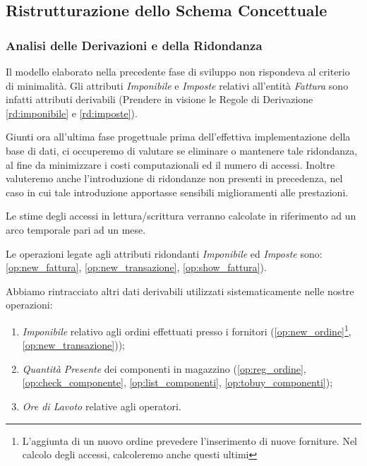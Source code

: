	\subsection{Ristrutturazione dello Schema Concettuale}

		\subsubsection{Analisi delle Derivazioni e della Ridondanza}

			Il modello elaborato nella precedente fase di sviluppo non rispondeva al criterio di minimalità. Gli attributi \emph{Imponibile} e \emph{Imposte} relativi all'entità \emph{Fattura} sono infatti attributi derivabili (Prendere in visione le Regole di Derivazione \ref{rd:imponibile} e \ref{rd:imposte}).

			Giunti ora all'ultima fase progettuale prima dell'effettiva implementazione della base di dati, ci occuperemo di valutare se eliminare o mantenere tale ridondanza, al fine da minimizzare i costi computazionali ed il numero di accessi. Inoltre valuteremo anche l'introduzione di ridondanze non presenti in precedenza, nel caso in cui tale introduzione apportasse sensibili miglioramenti alle prestazioni.

			Le stime degli accessi in lettura/scrittura verranno calcolate in riferimento ad un arco temporale pari ad un mese.

			Le operazioni legate agli attributi ridondanti \emph{Imponibile} ed \emph{Imposte} sono: \ref{op:new_fattura}, \ref{op:new_transazione}, \ref{op:show_fattura}).

			Abbiamo rintracciato altri dati derivabili utilizzati sistematicamente nelle nostre operazioni:

			\begin{enumerate}

				\item \emph{Imponibile} relativo agli ordini effettuati presso i fornitori (\ref{op:new_ordine}\footnote{L'aggiunta di un nuovo ordine prevedere l'inserimento di nuove forniture. Nel calcolo degli accessi, calcoleremo anche questi ultimi}, \ref{op:new_transazione}));
			
				\item \emph{Quantità Presente} dei componenti in magazzino (\ref{op:reg_ordine}, \ref{op:check_componente}, \ref{op:list_componenti}, \ref{op:tobuy_componenti});
			
				\item \emph{Ore di Lavoto} relative agli operatori.
			
			\end{enumerate}

